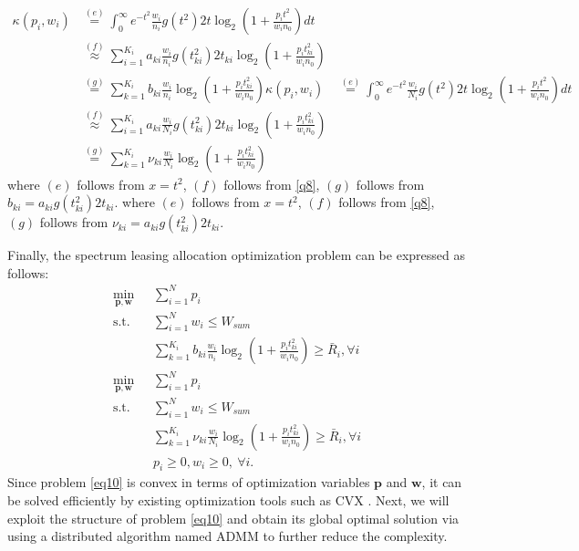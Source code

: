 \documentclass[journal]{IEEEtran}
\begin{document}
\begin{IEEEkeywords}
\begin{align} \label{q9}
\kappa \left(p_i, w_i\right) &\overset{\left(e\right)}{=} \int_{0}^{\infty}e^{-t^2}\frac{w_i}{n_i} g\left(t^2\right) 2t \log_2\left(1 + \frac{p_it^2}{w_in_0}\right)dt  \nonumber \\
& \overset{\left(f\right)}{\approx} \sum\limits_{i = 1}^{K_i}a_{ki}\frac{w_i}{n_i}g\left(t_{ki}^2\right)2t_{ki}\log_2\left(1 + \frac{p_it_{ki}^2}{w_in_0}\right) \nonumber \\
& \overset{\left(g\right)}{=} \sum\limits_{k = 1}^{K_i}b_{ki}\frac{w_i}{n_i}\log_2\left(1 + \frac{p_it_{ki}^2}{w_in_0}\right)
\kappa \left(p_i, w_i\right) &\overset{\left(e\right)}{=} \int_{0}^{\infty}e^{-t^2}\frac{w_i}{N_i} g\left(t^2\right) 2t \log_2\left(1 + \frac{p_it^2}{w_in_0}\right)dt  \nonumber \\
& \overset{\left(f\right)}{\approx} \sum\limits_{i = 1}^{K_i}a_{ki}\frac{w_i}{N_i}g\left(t_{ki}^2\right)2t_{ki}\log_2\left(1 + \frac{p_it_{ki}^2}{w_in_0}\right) \nonumber \\
& \overset{\left(g\right)}{=} \sum\limits_{k = 1}^{K_i}\nu_{ki}\frac{w_i}{N_i}\log_2\left(1 + \frac{p_it_{ki}^2}{w_in_0}\right)
\end{align}
where $\left(e\right)$ follows from $x = t^2$, $\left(f\right)$ follows from \eqref{q8}, $\left(g\right)$ follows from $b_{ki} = a_{ki}g\left(t_{ki}^2\right)2t_{ki}$.
where $\left(e\right)$ follows from $x = t^2$, $\left(f\right)$ follows from \eqref{q8}, $\left(g\right)$ follows from $\nu_{ki} = a_{ki}g\left(t_{ki}^2\right)2t_{ki}$.

Finally, the spectrum leasing allocation optimization problem can be expressed as follows:
\begin{subequations}\label{eq10}
	\begin{align}
	\min_{\mathbf{p}, \mathbf{w}}\ & \sum\limits_{i = 1}^{N} p_i \label{q10a} \\ \mbox{s.t.} \quad &  \sum\limits_{i = 1}^{N} w_i \leq W_{sum} \label{q10b} \\ \quad &  \sum\limits_{k = 1}^{K_i}b_{ki}\frac{w_i}{n_i}\log_2\left(1 + \frac{p_it_{ki}^2}{w_in_0}\right) \geq \bar{R}_i, \forall i \label{q10c}\\
	\min_{\mathbf{p}, \mathbf{w}}\ & \sum\limits_{i = 1}^{N} p_i \label{q10a} \\ \mbox{s.t.} \quad &  \sum\limits_{i = 1}^{N} w_i \leq W_{sum} \label{q10b} \\ \quad &  \sum\limits_{k = 1}^{K_i}\nu_{ki}\frac{w_i}{N_i}\log_2\left(1 + \frac{p_it_{ki}^2}{w_in_0}\right) \geq \bar{R}_i, \forall i \label{q10c}\\
	& p_i \geq 0, w_i \geq 0, \ \forall i. \label{q10d}
	\end{align}
\end{subequations}
Since problem \eqref{eq10} is convex in terms of optimization variables $\mathbf{p}$ and $\mathbf{w}$, it can be solved efficiently by existing optimization tools such as CVX \cite{SBoyd1}. Next, we will exploit the structure of problem \eqref{eq10} and obtain its global optimal solution via using a distributed algorithm named ADMM \cite{SBoyd2,EChen} to further reduce the complexity.

\end{IEEEkeywords}
\end{document}
